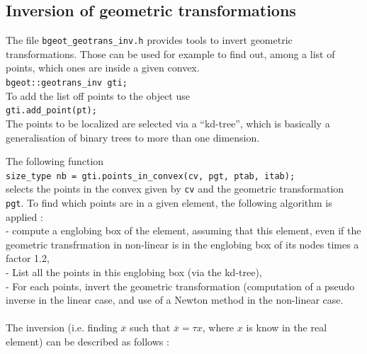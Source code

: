 \documentclass[11pt,a4paper]{article}
\begin{document}
\subsection{Inversion of geometric transformations}
The file {\tt bgeot\_geotrans\_inv.h} provides tools to invert geometric transformations. Those can be used for example to find out, among a list of points, which ones are inside a given convex.\\[0.5cm]
{\tt bgeot::geotrans\_inv gti; }\\[0.5cm]
To add the list off points to the object use\\[0.5cm]
{\tt gti.add\_point(pt);  }\\[0.5cm]
The points to be localized are selected via a ``kd-tree'', which is basically a generalisation of binary trees to more than one dimension.

The following function \\[0.5cm]
{\tt size\_type nb = gti.points\_in\_convex(cv, pgt, ptab, itab); }\\[0.5cm]
selects the points in the convex given by {\tt cv} and the geometric transformation {\tt pgt}.  To find which points are in a given element, the following algorithm is applied : \\
- compute a englobing box of the element, assuming that this element,
even if the geometric transfrmation in non-linear is in the englobing
box of its nodes times a factor 1.2, \\
- List all the points in this englobing box (via the kd-tree), \\
- For each points, invert the geometric transformation (computation
of a pseudo inverse in the linear case, and use of a Newton method in
the non-linear case. \\ \\
The inversion (i.e. finding $\overline{x}$ such that $\overline{x}=\tau{x}$, where $x$ is know in the real element) can be described as follows : \\ \\
\end{document}
